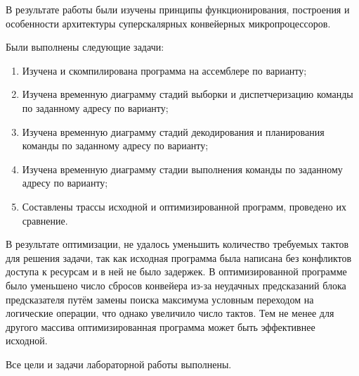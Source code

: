 В результате работы были изучены принципы функционирования,
построения и особенности архитектуры суперскалярных конвейерных микропроцессоров.

Были выполнены следующие задачи:

\begin{enumerate}
	\item Изучена и скомпилирована программа на ассемблере по варианту;
	\item Изучена временную диаграмму стадий выборки и диспетчеризацию команды по заданному адресу по варианту;
	\item Изучена временную диаграмму стадий декодирования и планирования команды по заданному адресу по варианту;
	\item Изучена временную диаграмму стадии выполнения команды по заданному адресу по варианту;
	\item Составлены трассы исходной и оптимизированной программ, проведено их сравнение.
\end{enumerate}

В результате оптимизации, не удалось уменьшить количество требуемых тактов для решения задачи, так как исходная программа была написана без конфликтов доступа к ресурсам и в ней не было задержек. В оптимизированной программе было уменьшено число сбросов конвейера из-за неудачных предсказаний блока предсказателя путём замены поиска максимума условным переходом на логические операции, что однако увеличило число тактов. Тем не менее для другого массива оптимизированная программа может быть эффективнее исходной.

Все цели и задачи лабораторной работы выполнены.